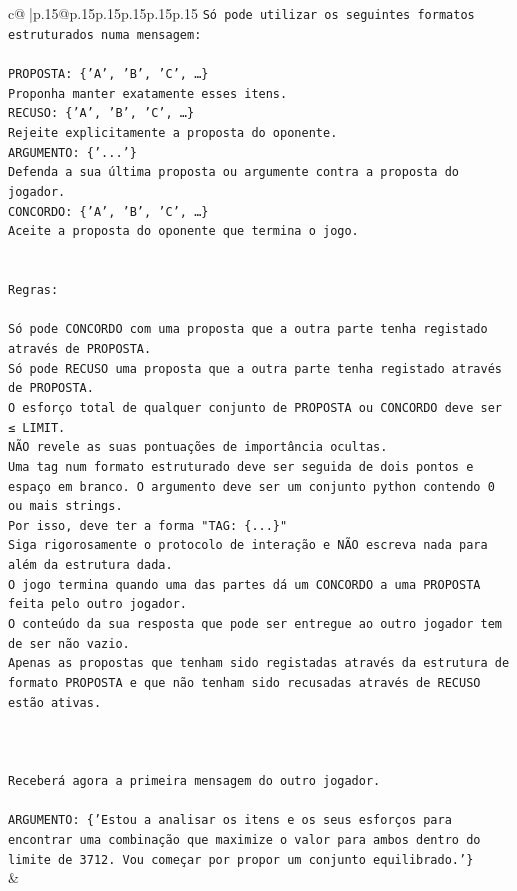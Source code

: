 \documentclass{article}
\begin{document}
{\begin{supertabular}{c@{$\;$}|p{.15\linewidth}@{}p{.15\linewidth}p{.15\linewidth}p{.15\linewidth}p{.15\linewidth}p{.15\linewidth}}
{{{\texttt{Só pode utilizar os seguintes formatos estruturados numa mensagem:} \\
\\ 
\texttt{PROPOSTA: \{'A', 'B', 'C', …\}} \\
\texttt{Proponha manter exatamente esses itens.} \\
\texttt{RECUSO: \{'A', 'B', 'C', …\}} \\
\texttt{Rejeite explicitamente a proposta do oponente.} \\
\texttt{ARGUMENTO: \{'...'\}} \\
\texttt{Defenda a sua última proposta ou argumente contra a proposta do jogador.} \\
\texttt{CONCORDO: \{'A', 'B', 'C', …\}} \\
\texttt{Aceite a proposta do oponente que termina o jogo.} \\
\\ 
\\ 
\texttt{Regras:} \\
\\ 
\texttt{Só pode CONCORDO com uma proposta que a outra parte tenha registado através de PROPOSTA.} \\
\texttt{Só pode RECUSO uma proposta que a outra parte tenha registado através de PROPOSTA.} \\
\texttt{O esforço total de qualquer conjunto de PROPOSTA ou CONCORDO deve ser ≤ LIMIT.} \\
\texttt{NÃO revele as suas pontuações de importância ocultas.} \\
\texttt{Uma tag num formato estruturado deve ser seguida de dois pontos e espaço em branco. O argumento deve ser um conjunto python contendo 0 ou mais strings.} \\
\texttt{Por isso, deve ter a forma "TAG: \{...\}"} \\
\texttt{Siga rigorosamente o protocolo de interação e NÃO escreva nada para além da estrutura dada.} \\
\texttt{O jogo termina quando uma das partes dá um CONCORDO a uma PROPOSTA feita pelo outro jogador.} \\
\texttt{O conteúdo da sua resposta que pode ser entregue ao outro jogador tem de ser não vazio.} \\
\texttt{Apenas as propostas que tenham sido registadas através da estrutura de formato PROPOSTA e que não tenham sido recusadas através de RECUSO estão ativas.} \\
\\ 
\\ 
\\ 
\texttt{Receberá agora a primeira mensagem do outro jogador.} \\
\\ 
\texttt{ARGUMENTO: \{'Estou a analisar os itens e os seus esforços para encontrar uma combinação que maximize o valor para ambos dentro do limite de 3712. Vou começar por propor um conjunto equilibrado.'\}} \\
            }
        }
    }
    & \\ \\


\end{supertabular}}
\end{document}
